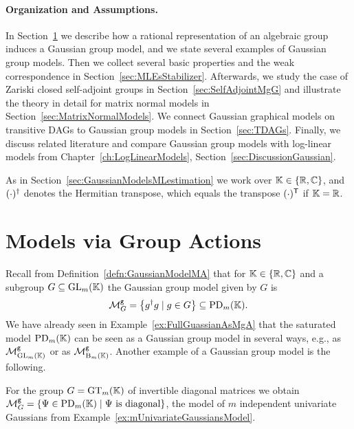 \paragraph{Organization and Assumptions.}
In Section~\ref{sec:ModelsViaAction} we describe how a rational representation of an algebraic group induces a Gaussian group model, and we state several examples of Gaussian group models. Then we collect several basic properties and the weak correspondence in Section~\ref{sec:MLEsStabilizer}. Afterwards, we study the case of Zariski closed self-adjoint groups in Section~\ref{sec:SelfAdjointMgG} and illustrate the theory in detail for matrix normal models in Section~\ref{sec:MatrixNormalModels}. We connect Gaussian graphical models on transitive DAGs to Gaussian group models in Section~\ref{sec:TDAGs}.
Finally, we discuss related literature and compare Gaussian group models with log-linear models from Chapter~\ref{ch:LogLinearModels}, Section~\ref{sec:DiscussionGaussian}.

As in Section~\ref{sec:GaussianModelsMLestimation} we work over $\mathbb K \in \{\mathbb R, \mathbb C\}$, and $(\cdot)^{\dagger}$ denotes the Hermitian transpose, which equals the transpose $(\cdot)^{\mathsf{T}}$ if $\mathbb K = \mathbb R$.







\section{Models via Group Actions}\label{sec:ModelsViaAction}

Recall from Definition~\ref{defn:GaussianModelMA} that for $\mathbb K \in \{\mathbb R, \mathbb C\}$ and a subgroup $G \subseteq \operatorname{GL}_m(\mathbb K)$ the Gaussian group model given by $G$ is
	\[\mathcal{M}^{\mathtt{g}}_G = \left\lbrace g^{\dagger} g \mid g \in G  \right\rbrace \subseteq \operatorname{PD}_m(\mathbb K).\]
We have already seen in Example~\ref{ex:FullGuassianAsMgA} that the saturated model $\operatorname{PD}_m(\mathbb K)$ can be seen as a Gaussian group model in several ways, e.g., as $\mathcal{M}^{\mathtt{g}}_{\operatorname{GL}_m(\mathbb K)}$ or as $\mathcal{M}^{\mathtt{g}}_{\operatorname{B}_m(\mathbb K)}$. Another example of a Gaussian group model is the following.

\begin{example}\label{ex:mUnivariateGaussiansAsMgG}
	For the group $G = \operatorname{GT}_m(\mathbb K)$ of invertible diagonal matrices we obtain $\mathcal{M}^{\mathtt{g}}_{G} = \{\Psi \in \operatorname{PD}_m(\mathbb K) \mid \Psi \text{ is diagonal}\}$, the model of $m$ independent univariate Gaussians from Example~\ref{ex:mUnivariateGaussiansModel}.
	\hfill\exSymbol
\end{example}

